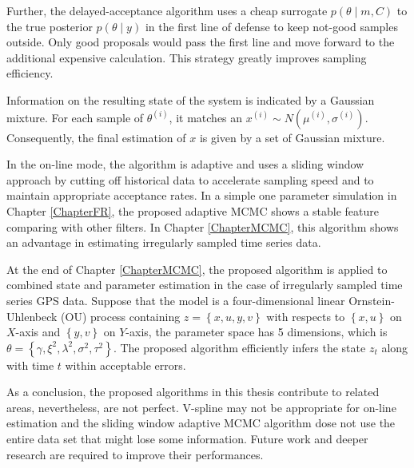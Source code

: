 Further, the delayed-acceptance algorithm uses a cheap surrogate $p(\theta\mid m, C)$ to the true posterior $p(\theta\mid y)$ in the first line of defense to keep not-good samples outside. Only good proposals would pass the first line and move forward to the additional expensive calculation. This strategy greatly improves sampling efficiency. 

Information on the resulting state of the system is indicated by a Gaussian mixture. For each sample of $\theta^{(i)}$, it matches an $x^{(i)} \sim N\left(\mu^{(i)},\sigma^{(i)}\right)$. Consequently, the final estimation of $x$ is given by a set of Gaussian mixture. 

In the on-line mode, the algorithm is adaptive and uses a sliding window approach by cutting off historical data to accelerate sampling speed and to maintain appropriate acceptance rates. In a simple one parameter simulation in Chapter \ref{ChapterFR}, the proposed adaptive MCMC shows a stable feature comparing with other filters. In Chapter \ref{ChapterMCMC}, this algorithm shows an advantage in estimating irregularly sampled time series data. 

At the end of Chapter \ref{ChapterMCMC}, the proposed algorithm is applied to combined state and parameter estimation in the case of irregularly sampled time series GPS data. Suppose that the model is a four-dimensional linear Ornstein-Uhlenbeck (OU) process containing $z=\left\lbrace x,u,y,v\right\rbrace$ with respects to $\left\lbrace x,u\right\rbrace$ on $X$-axis and $\left\lbrace y,v\right\rbrace$ on $Y$-axis, the parameter space has 5 dimensions, which is  $\theta=\left\lbrace\gamma,\xi^2,\lambda^2,\sigma^2,\tau^2\right\rbrace$. The proposed algorithm efficiently infers the state $z_t$ along with time $t$ within acceptable errors. 

As a conclusion, the proposed algorithms in this thesis contribute to related areas, nevertheless, are not perfect. V-spline may not be appropriate for on-line estimation and the sliding window adaptive MCMC algorithm dose not use the entire data set that might lose some information. Future work and deeper research are required to improve their performances. 
